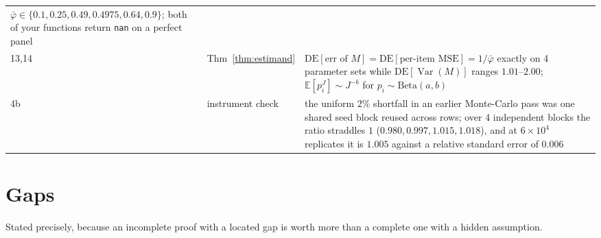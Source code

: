 \documentclass[11pt]{article}
\theoremstyle{plain}
\theoremstyle{definition}
\theoremstyle{remark}
\newcommand{\Var}{\operatorname{Var}}
\newcommand{\E}{\mathbb{E}}
\newcommand{\pb}{\bar{\varphi}}
\begin{document}
\begin{center}
\begin{tabular}{@{}llp{6.4cm}@{}}
$\pb\in\{0.1,0.25,0.49,0.4975,0.64,0.9\}$; both of your functions return \texttt{nan} on a
perfect panel \\
13,14 & Thm~\ref{thm:estimand} & $\mathrm{DE}[\text{err of }M]=\mathrm{DE}[\text{per-item
MSE}]=1/\pb$ exactly on 4 parameter sets while $\mathrm{DE}[\Var(M)]$ ranges $1.01$--$2.00$;
$\E[p_i^J]\sim J^{-b}$ for $p_i\sim\mathrm{Beta}(a,b)$ \\
4b & instrument check & the uniform $2\%$ shortfall in an earlier Monte-Carlo pass was one shared
seed block reused across rows; over 4 independent blocks the ratio straddles $1$
($0.980,0.997,1.015,1.018$), and at $6\times10^4$ replicates it is $1.005$ against a relative
standard error of $0.006$ \\
\bottomrule
\end{tabular}
\end{center}

\section{Gaps}

Stated precisely, because an incomplete proof with a located gap is worth more than a complete
one with a hidden assumption.
\end{document}
